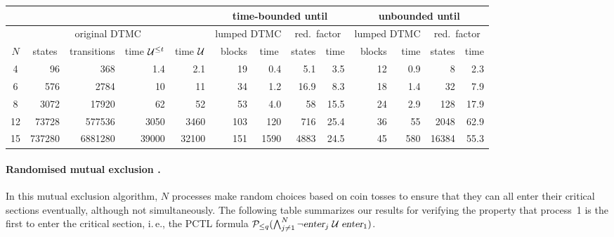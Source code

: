 \documentclass{llncs}
\begin{document}
{\scriptsize
\begin{center}
\begin{tabular}{|c|r|r|r|r|r|r|r|r|r|r|r|r|}
\hline 
  \multicolumn{5}{|c|}{} & \multicolumn{4}{c|}{time-bounded until}
  & \multicolumn{4}{c|}{unbounded until} \\ \hline
  \multicolumn{5}{|c|}{original DTMC} & \multicolumn{2}{c|}{lumped DTMC}  
  & \multicolumn{2}{c|}{red.\ factor}  & \multicolumn{2}{c|}{lumped DTMC}  
  & \multicolumn{2}{c|}{red.\ factor}\\[1ex] \hline 
$N$& \multicolumn{1}{c|}{states} &transitions&time $\mathrel{\mathcal{U}}^{\leq t}$& \multicolumn{1}{c|}{time $\mathrel{\mathcal{U}}$} & blocks & \multicolumn{1}{c|}{time} & states & time 
  & blocks & time & states & time \\ \hline
 4&    96&    368&    1.4          &   2.1           &  19&   0.4          &   5.1          & 3.5&12&  0.9          &    8& 2.3 \\
 6&   576&   2784&   10\phantom{.0}&   11\phantom{.0}&  34&   1.2          &  16.9          & 8.3&18&  1.4          &   32& 7.9 \\
 8&  3072&  17920&   62\phantom{.0}&   52\phantom{.0}&  53&   4.0          &  58\phantom{.0}&15.5&24&  2.9          &  128&17.9  \\
12& 73728& 577536& 3050\phantom{.0}&  3460\phantom{.0} &103 & 120\phantom{.0}& 716\phantom{.0}&25.4&36& 55\phantom{.0}& 2048&62.9  \\
15&737280&6881280&39000\phantom{.0}&32100\phantom{.0}& 151&1590\phantom{.0}&4883\phantom{.0}&24.5&45&580\phantom{.0}&16384&55.3 \\ \hline
\end{tabular}
\end{center}
}

\paragraph{Randomised mutual exclusion \cite{PnueliZ_DC86}.}
%
In this mutual exclusion algorithm, $N$ processes make random choices based on coin tosses 
to ensure that they can all enter their critical sections eventually, although not simultaneously.
The following table summarizes our results for verifying the property that process~1
is the first to enter the critical section, i.\,e., the PCTL formula ${\cal P}_{\leq q}(\bigwedge_{j \neq 1}^N
\neg \mbox{\sl enter}_j \mathrel{\mathcal{U}} \mbox{\sl  enter}_1)$.
\end{document}
